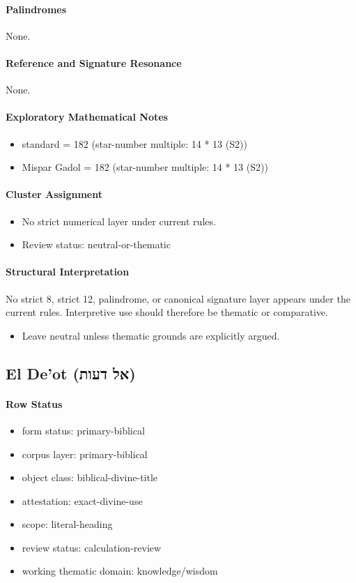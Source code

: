 \paragraph{Palindromes}
None.
\paragraph{Reference and Signature Resonance}
None.
\paragraph{Exploratory Mathematical Notes}
\begin{itemize}
\item standard = 182 (star-number multiple: 14 * 13 (S2))
\item Mispar Gadol = 182 (star-number multiple: 14 * 13 (S2))
\end{itemize}
\paragraph{Cluster Assignment}
\begin{itemize}
\item No strict numerical layer under current rules.
\item Review status: neutral-or-thematic
\end{itemize}
\paragraph{Structural Interpretation}
No strict 8, strict 12, palindrome, or canonical signature layer appears under the current rules. Interpretive use should therefore be thematic or comparative.

\begin{itemize}
\item Leave neutral unless thematic grounds are explicitly argued.
\end{itemize}

\subsection{El De’ot (אל דעות)}
\paragraph{Row Status}
\begin{itemize}
\item form status: primary-biblical
\item corpus layer: primary-biblical
\item object class: biblical-divine-title
\item attestation: exact-divine-use
\item scope: literal-heading
\item review status: calculation-review
\item working thematic domain: knowledge/wisdom
\end{itemize}
